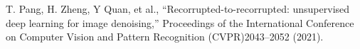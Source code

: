 T. Pang, H. Zheng, Y Quan, et al., “Recorrupted-to-recorrupted: unsupervised deep learning for image denoising,” Proceedings of the International Conference on Computer Vision and Pattern Recognition (CVPR)2043–2052 (2021).
